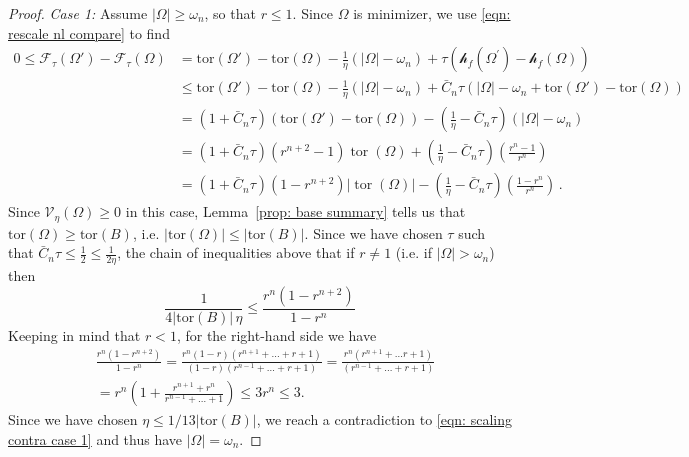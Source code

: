 \documentclass[10pt, reqno]{amsart}
\numberwithin{equation}{section}
\def\W{\Omega}
\def\om{\omega}
\def\tor{\mathrm{tor}}
\def\vpar{\eta}
\def\fv{\mathscr{V}_{\vpar}}
\def\err{\tau}
\def\Ep{\mathcal{F}_{\err}}
\def\nl{\mathscr{h}_f}
\begin{document}
\begin{proof}
{\it Case 1:} Assume $|\W| \geq \omega_n$, so that $r\leq 1$.
Since $\W$ is  minimizer, we use \eqref{eqn: rescale nl compare} to find 
\begin{align*}
0 \leq \Ep(\W') - \Ep(\W) & = \tor (\W') - \tor(\W) -\frac{1}{\eta}\left(|\Omega|-\omega_n\right)+\tau\left(\nl\left(\Omega^{\prime}\right)-\nl(\Omega)\right) \\
& \leq \tor (\W') - \tor(\W)-\frac{1}{\eta}\left(|\Omega|-\omega_n\right)+\bar{C}_n\tau  \left(  |\W| -\om_n+  \tor (\W') - \tor(\W)\right) \\
& =\left(1+\bar{C}_n\tau  \right) (\tor (\W') - \tor(\W) )-\left(\frac{1}{\eta}-\bar{C}_n\tau \right)\left(|\Omega|-\omega_n\right) \\
 & =\left(1+ \bar{C}_n \tau \right)\left(r^{n+2}-1\right) \operatorname{tor}(\Omega)+\left(\frac{1}{\eta}- \bar{C}_n \tau\right)\left(\frac{r^n-1}{r^n}\right) \\
& =\left(1+ \bar{C}_n \tau\right)\left(1-r^{n+2}\right)|\operatorname{tor}(\Omega)|-\left(\frac{1}{\eta}- \bar{C}_n\tau\right)\left(\frac{1-r^n}{r^n}\right)\,.
\end{align*}
Since $\fv(\W) \geq0$ in this case, Lemma~\ref{prop: base summary} tells us that $\tor(\W) \geq \tor(B)$, i.e. $|\tor(\W)|\leq |\tor(B)|.$ Since we have chosen $\tau$ such that $\bar{C}_n \tau \leq \frac{1}{2} \leq \frac{1}{2\eta}$, the chain of inequalities above that if $r\neq 1$ (i.e. if $|\W|>\om_n$) then
\begin{equation}\label{eqn: scaling contra case 1}
    \frac{1}{4|\tor(B)|\, \eta}  \leq  \frac{r^n(1-r^{n+2})}{1-r^n}
\end{equation}
Keeping in mind that $r<1$, for the right-hand side we have
\begin{align*}
& \frac{r^n\left(1-r^{n+2}\right)}{1-r^n}=\frac{r^n(1-r)\left(r^{n+1}+\ldots+r+1\right)}{(1-r)\left(r^{n-1}+\ldots+r+1\right)}=\frac{r^n\left(r^{n+1}+\ldots r+1\right)}{\left(r^{n-1}+\ldots+r+1\right)} \\
&=r^n\left(1+\frac{r^{n+1}+r^n}{r^{n-1}+\ldots+1}\right) \leq 3 r^n \leq 3 .
\end{align*}
{Since we have chosen $\eta \leq 1/13|\tor(B)|$,} we reach a 
contradiction to \eqref{eqn: scaling contra case 1} and thus have $|\W| = \omega_n$.



\end{proof}
\end{document}
